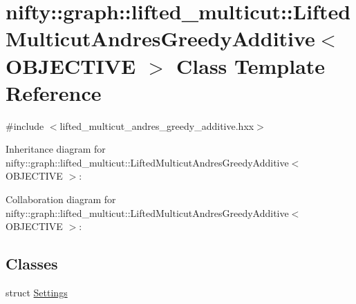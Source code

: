 \hypertarget{classnifty_1_1graph_1_1lifted__multicut_1_1LiftedMulticutAndresGreedyAdditive}{}\section{nifty\+:\+:graph\+:\+:lifted\+\_\+multicut\+:\+:Lifted\+Multicut\+Andres\+Greedy\+Additive$<$ O\+B\+J\+E\+C\+T\+I\+V\+E $>$ Class Template Reference}
\label{classnifty_1_1graph_1_1lifted__multicut_1_1LiftedMulticutAndresGreedyAdditive}


{\ttfamily \#include $<$lifted\+\_\+multicut\+\_\+andres\+\_\+greedy\+\_\+additive.\+hxx$>$}



Inheritance diagram for nifty\+:\+:graph\+:\+:lifted\+\_\+multicut\+:\+:Lifted\+Multicut\+Andres\+Greedy\+Additive$<$ O\+B\+J\+E\+C\+T\+I\+V\+E $>$\+:


Collaboration diagram for nifty\+:\+:graph\+:\+:lifted\+\_\+multicut\+:\+:Lifted\+Multicut\+Andres\+Greedy\+Additive$<$ O\+B\+J\+E\+C\+T\+I\+V\+E $>$\+:
\subsection*{Classes}
\begin{DoxyCompactItemize}
\item 
struct \hyperlink{structnifty_1_1graph_1_1lifted__multicut_1_1LiftedMulticutAndresGreedyAdditive_1_1Settings}{Settings}
\end{DoxyCompactItemize}
